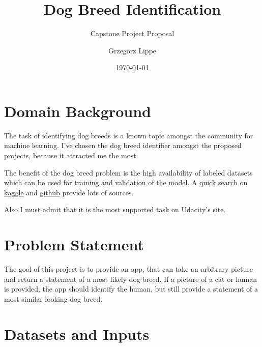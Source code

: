\documentclass[paper=A4, DIV=11, parskip=half]{scrartcl}
\title{Dog Breed Identification}
\subtitle{Capstone Project Proposal}
\author{Grzegorz Lippe}
\date{\today}
\begin{document}
\maketitle

\section*{Domain Background}

The task of identifying dog breeds is a known topic amongst the community for machine
learning. I've chosen the dog breed identifier amongst the proposed projects, because it
attracted me the most.

The benefit of the dog breed problem is the high availability of labeled datasets which
can be used for training and validation of the model. A quick search on
\href{https://www.kaggle.com/c/dog-breed-identification/notebooks}{kaggle} and
\href{https://github.com/search?q=dog+breed}{github} provide lots of sources.

Also I must admit that it is the most supported task on Udacity's site.


\section*{Problem Statement}

The goal of this project is to provide an app, that can take an arbitrary picture and
return a statement of a most likely dog breed. If a picture of a cat or human is provided,
the app should identify the human, but still provide a statement of a most similar looking
dog breed.


\section*{Datasets and Inputs}
\end{document}
